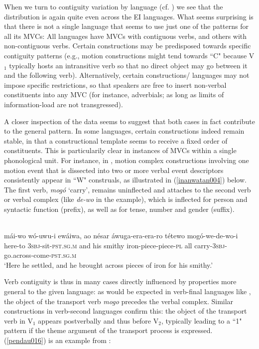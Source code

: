 When we turn to contiguity variation by language (cf. ) we see that the distribution is again quite even across the EI languages. What seems surprising is that there is not a single language that seems to use just one of the patterns for all its MVCs: All languages have MVCs with contiguous verbs, and others with non-contiguous verbs. Certain constructions may be predisposed towards specific contiguity patterns (e.g., motion constructions might tend towards ``C" because V$_1$ typically hosts an intransitive verb so that no direct object may go between it and the following verb). Alternatively, certain constructions/ languages may not impose specific restrictions, so that speakers are free to insert non-verbal constituents into any MVC (for instance, adverbials; as long as limits of information-load are not transgressed). 

\largerpage[1]
A closer inspection of the data seems to suggest that both cases in fact contribute to the general pattern. In some languages, certain constructions indeed remain stable, in that a constructional template seems to receive a fixed order of constituents. This is particularily clear in instances of MVCs within a single phonological unit. For instance, in , motion complex constructions involving one motion event that is dissected into two or more verbal event descriptors consistently appear in ``W" construals, as illustrated in (\ref{inanwatan004}) below. The first verb, \textit{mogó} `carry', remains uninflected and attaches to the second verb or verbal complex (like \textit{de-wo} in the example), which is inflected for person and syntactic function (prefix), as well as for tense, number and gender (suffix).

\ea \label{inanwatan004}
\\
\gll mái-wo wó-uwu-i ewáiwa, ao nésar áwuga-era-era-ro tétewo mogó-we-de-wo-i \\
here-to 3\textsc{sbj}-sit-\textsc{pst}.\textsc{sg}.\textsc{m} and his smithy iron-piece-piece-\textsc{pl} all carry-3\textsc{sbj}-go.across-come-\textsc{pst}.\textsc{sg}.\textsc{m} \\
\glft `Here he settled, and he brought across pieces of iron for his smithy.'\\ 
\z

Verb contiguity is thus in many cases directly influenced by properties more general to the given language: as would be expected in verb-final languages like , the object of the transport verb \textit{mogo} precedes the verbal complex. Similar constructions in verb-second languages confirm this: the object of the transport verb in V$_1$ appears postverbally and thus before V$_2$, typically leading to a ``1" pattern if the theme argument of the transport process is expressed. (\ref{pendau016}) is an example from :

